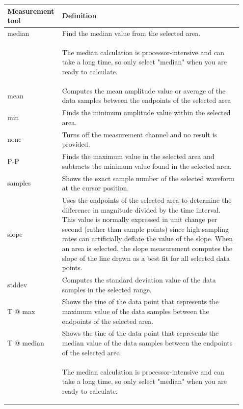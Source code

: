 \documentclass{article}
\begin{document}
\begin{table}[t!]
	\centering
\begin{tabular}[t!]{p{0.2\linewidth}p{0.75\linewidth}}
\toprule
Measurement tool & Definition\\
\midrule
median & Find the median value from the selected area.\\
	& \begin{warn}
		The median calculation is processor-intensive and can take a long time, so only select "median" when you are ready to calculate.
	\end{warn}\\
	\midrule
mean & Computes the mean amplitude value or average of the data samples between the endpoints of the selected area\\
\midrule
min & Finds the minimum amplitude value within the selected area.\\
\midrule
none & Turns off the measurement channel and no result is provided.\\
\midrule
P-P & Finds the maximum value in the selected area and subtracts the minimum value found in the selected area.\\
\midrule
samples & Shows the exact sample number of the selected waveform at the cursor position.\\
\midrule
slope & Uses the endpoints of the selected area to determine the difference in magnitude divided by the time interval. This value is normally expressed in unit change per second (rather than sample points) since high sampling rates can artificially deflate the value of the slope. When an area is selected, the slope measurement computes the slope of the line drawn as a best fit for all selected data points.\\
\midrule
stddev & Computes the standard deviation value of the data samples in the selected range.\\
\midrule
T @ max & Shows the tine of the data point that represents the maximum value of the data samples between the endpoints of the selected area.\\
\midrule
T @ median & Shows the tine of the data point that represents the median value of the data samples between the endpoints of the selected area.\\
	& \begin{warn}
		The median calculation is processor-intensive and can take a long time, so only select "median" when you are ready to calculate.
	\end{warn}\\

\end{tabular}
\end{table}
\end{document}

